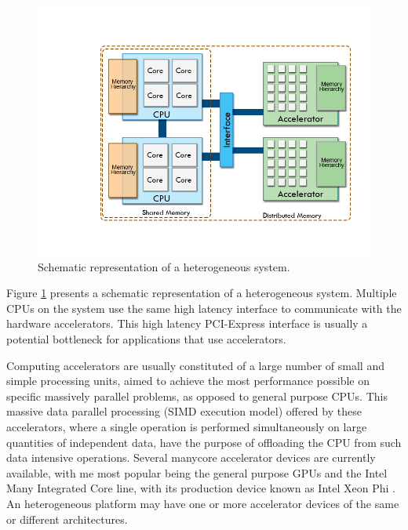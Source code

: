 \begin{figure}[!htp]
	\begin{center}
		\includegraphics[scale=0.45]{imgs/heteroplats.png}
		\caption{Schematic representation of a heterogeneous system.}
		\label{fig:heteroplat}
	\end{center}
\end{figure}

Figure \ref{fig:heteroplat} presents a schematic representation of a heterogeneous system. Multiple CPUs on the system use the same high latency interface to communicate with the hardware accelerators. This high latency PCI-Express interface is usually a potential bottleneck for applications that use accelerators.

Computing accelerators are usually constituted of a large number of small and simple processing units, aimed to achieve the most performance possible on specific massively parallel problems, as opposed to general purpose CPUs. This massive data parallel processing (SIMD execution model) offered by these accelerators, where a single operation is performed simultaneously on large quantities of independent data, have the purpose of offloading the CPU from such data intensive operations. Several manycore accelerator devices are currently available, with me most popular being the general purpose GPUs and the Intel Many Integrated Core line, with its production device known as Intel Xeon Phi \cite{Intel:MIC}. An heterogeneous platform may have one or more accelerator devices of the same or different architectures.

